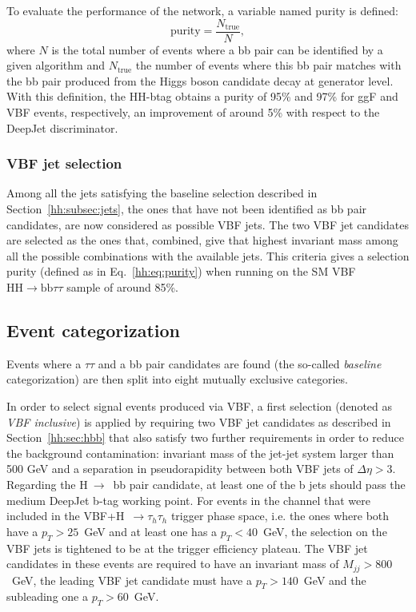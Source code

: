 \documentclass[../main.tex]{subfiles}
\begin{document}
To evaluate the performance of the network, a variable named purity is defined:
\begin{equation}
	\text{purity} = \frac{N_{\text{true}}}{N},
	\label{hh:eq:purity}
\end{equation}
where $N$ is the total number of events where a bb pair can be identified by a given algorithm and $N_{\text{true}}$ the number of events where this bb pair matches with the bb pair produced from the Higgs boson candidate decay at generator level. With this definition, the HH-btag obtains a purity of 95\% and 97\% for ggF and VBF events, respectively, an improvement of around 5\% with respect to the DeepJet discriminator.


\subsubsection{VBF jet selection}

Among all the jets satisfying the baseline selection described in Section~\ref{hh:subsec:jets}, the ones that have not been identified as bb pair candidates, are now considered as possible VBF jets. The two VBF jet candidates are selected as the ones that, combined, give that highest invariant mass among all the possible combinations with the available jets. This criteria gives a selection purity (defined as in Eq.~\ref{hh:eq:purity}) when running on the SM VBF $\text{HH}\to\text{bb}\tau\tau$ sample of around 85\%.

\subsection{Event categorization}
\label{hh:sec:event_categorization}

Events where a $\tau\tau$ and a bb pair candidates are found (the so-called \textit{baseline} categorization) are then split into eight mutually exclusive categories. 

In order to select signal events produced via VBF, a first selection (denoted as \textit{VBF inclusive}) is applied by requiring two VBF jet candidates as described in Section~\ref{hh:sec:hbb} that also satisfy two further requirements in order to reduce the background contamination: invariant mass of the jet-jet system larger than 500 GeV and a separation in pseudorapidity between both VBF jets of $\Delta\eta>3$. Regarding the H$~\to$~bb pair candidate, at least one of the b jets should pass the medium DeepJet b-tag working point. For events in the \tauh\tauh{} channel that were included in the VBF+H~$\to\tau_h\tau_h$ trigger phase space, i.e. the ones where both \tauh{} have a $p_T>25$~GeV and at least one has a $p_T<40$~GeV, the selection on the VBF jets is tightened to be at the trigger efficiency plateau. The VBF jet candidates in these events are required to have an invariant mass of $M_{jj}>800$~GeV, the leading VBF jet candidate must have a $p_T>140$~GeV and the subleading one a $p_T>60$~GeV.
\end{document}
